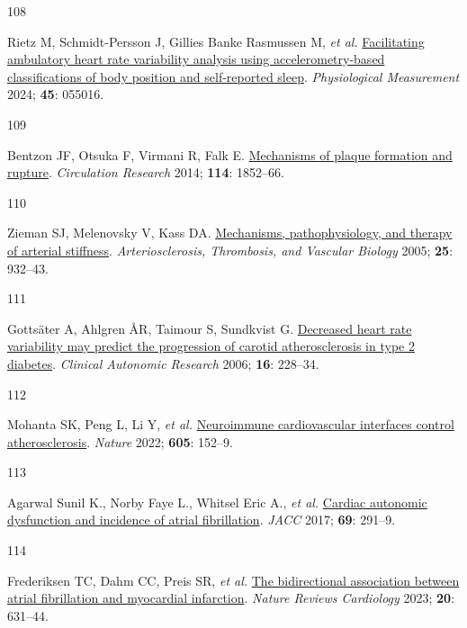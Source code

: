 \documentclass[
  a4paper,
  headsepline=true,
  open=left]{scrbook}
\newlength{\cslhangindent}
\newlength{\csllabelwidth}
\newlength{\cslentryspacingunit} %
\newenvironment{CSLReferences}[2] %
 {%
  \setlength{\parindent}{0pt}
  \ifodd #1
  \let\oldpar\par
  \def\par{\hangindent=\cslhangindent\oldpar}
  \fi
  \setlength{\parskip}{#2\cslentryspacingunit}
 }%
 {}
\newcommand{\CSLLeftMargin}[1]{\parbox[t]{\csllabelwidth}{#1}}
\newcommand{\CSLRightInline}[1]{\parbox[t]{\linewidth - \csllabelwidth}{#1}\break}
\begin{document}
\begin{CSLReferences}{0}{0}
\leavevmode{}%
\CSLLeftMargin{108 }%
\CSLRightInline{Rietz M, Schmidt-Persson J, Gillies Banke Rasmussen M,
\emph{et al.}
\href{https://doi.org/10.1088/1361-6579/ad450d}{Facilitating ambulatory
heart rate variability analysis using accelerometry-based
classifications of body position and self-reported sleep}.
\emph{Physiological Measurement} 2024; \textbf{45}: 055016.}

\leavevmode{}%
\CSLLeftMargin{109 }%
\CSLRightInline{Bentzon JF, Otsuka F, Virmani R, Falk E.
\href{https://doi.org/10.1161/CIRCRESAHA.114.302721}{Mechanisms of
plaque formation and rupture}. \emph{Circulation Research} 2014;
\textbf{114}: 1852--66.}

\leavevmode{}%
\CSLLeftMargin{110 }%
\CSLRightInline{Zieman SJ, Melenovsky V, Kass DA.
\href{https://doi.org/10.1161/01.ATV.0000160548.78317.29}{Mechanisms,
pathophysiology, and therapy of arterial stiffness}.
\emph{Arteriosclerosis, Thrombosis, and Vascular Biology} 2005;
\textbf{25}: 932--43.}

\leavevmode{}%
\CSLLeftMargin{111 }%
\CSLRightInline{Gottsäter A, Ahlgren ÅR, Taimour S, Sundkvist G.
\href{https://doi.org/10.1007/s10286-006-0345-4}{Decreased heart rate
variability may predict the progression of carotid atherosclerosis in
type 2 diabetes}. \emph{Clinical Autonomic Research} 2006; \textbf{16}:
228--34.}

\leavevmode{}%
\CSLLeftMargin{112 }%
\CSLRightInline{Mohanta SK, Peng L, Li Y, \emph{et al.}
\href{https://doi.org/10.1038/s41586-022-04673-6}{Neuroimmune
cardiovascular interfaces control atherosclerosis}. \emph{Nature} 2022;
\textbf{605}: 152--9.}

\leavevmode{}%
\CSLLeftMargin{113 }%
\CSLRightInline{Agarwal Sunil K., Norby Faye L., Whitsel Eric A.,
\emph{et al.} \href{https://doi.org/10.1016/j.jacc.2016.10.059}{Cardiac
autonomic dysfunction and incidence of atrial fibrillation}. \emph{JACC}
2017; \textbf{69}: 291--9.}

\leavevmode{}%
\CSLLeftMargin{114 }%
\CSLRightInline{Frederiksen TC, Dahm CC, Preis SR, \emph{et al.}
\href{https://doi.org/10.1038/s41569-023-00857-3}{The bidirectional
association between atrial fibrillation and myocardial infarction}.
\emph{Nature Reviews Cardiology} 2023; \textbf{20}: 631--44.}


\end{CSLReferences}
\end{document}
